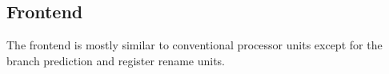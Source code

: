 \subsection{Frontend}
\label{sec:cpu_frontend}

The frontend is mostly similar to conventional processor units except for the
branch prediction and register rename units.





% 
